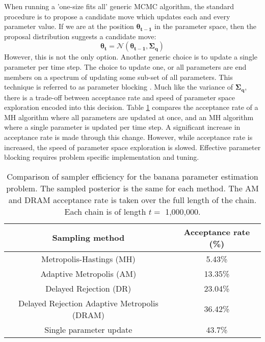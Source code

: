 When running a 'one-size fits all' generic MCMC algorithm, the standard procedure is to propose a candidate move which updates each and every parameter value. If we are at the position $\bm{\theta_{t-1}}$ in the parameter space, then the proposal distribution suggests a candidate move:
\begin{equation}
	\bm{\theta_{t}} = \mathcal{N}(\bm{\theta_{t-1}},\bm{\Sigma_q})
\end{equation}
However, this is not the only option. Another generic choice is to update a single parameter per time step. The choice to update one, or all parameters are end members on a spectrum of updating some sub-set of all parameters. This technique is referred to as parameter blocking \citep{Roberts1997,Sargent2000}. Much like the variance of $\bm{\Sigma_q}$, there is a trade-off between acceptance rate and speed of parameter space exploration encoded into this decision. Table \ref{sampling-method-comparison} compares the acceptance rate of a MH algorithm where all parameters are updated at once, and an MH algorithm where a single parameter is updated per time step. A significant increase in acceptance rate is made through this change. However, while acceptance rate is increased, the speed of parameter space exploration is slowed. Effective parameter blocking requires problem specific implementation and tuning. 

\begin{table}[H]
	\centering
	\begin{tabular}{|c|c|}
	\hline
	Sampling method & Acceptance rate (\%) \\
	\hline
	Metropolis-Hastings (MH) & 5.43\% \\
	\hline
	Adaptive Metropolis (AM) & 13.35\% \\
	\hline
	Delayed Rejection (DR) & 23.04\% \\
	\hline
	Delayed Rejection Adaptive Metropolis (DRAM) & 36.42\% \\
	\hline
	Single parameter update & 43.7\% \\
	\hline
	\end{tabular}
	\caption{Comparison of sampler efficiency for the banana parameter estimation problem. The sampled posterior is the same for each method. The AM and DRAM acceptance rate is taken over the full length of the chain. Each chain is of length $t = $ 1,000,000.}
	\label{sampling-method-comparison}
\end{table}

